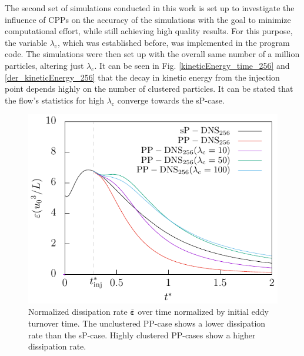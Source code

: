 \documentclass[11pt,a4paper,openany,oneside,parskip=half*]{article}
\renewcommand*\vec[1]{\boldsymbol{#1}}
\begin{document}
\newline
The second set of simulations conducted in this work is set up to investigate the influence of CPPs on the accuracy of the simulations with the goal to minimize computational effort, while still achieving high quality results. For this purpose, the variable $\lambda_\mathrm{c}$, which was established before, was implemented in the program code. The simulations were then set up with the overall same number of a million particles, altering just $\lambda_\mathrm{c}$. It can be seen in Fig. \ref{kineticEnergy_time_256} and \ref{der_kineticEnergy_256} that the decay in kinetic energy from the injection point depends highly on the number of clustered particles. It can be stated that the flow's statistics for high $\lambda_\mathrm{c}$ converge towards the sP-case. 
\begin{figure}[h]
    \centering
    \begin{minipage}[t]{0.5\textwidth}
         \centering
        \includegraphics[width=\linewidth]{./Abbildungen/256/diss_time.pdf}
        \caption{Normalized dissipation rate $\bar{\vec{\varepsilon}}$ over time normalized by initial eddy turnover time. The unclustered PP-case shows a lower dissipation rate than the sP-case. Highly clustered PP-cases show a higher dissipation rate.}
        \label{diss_time_256}
    \end{minipage}%
    \begin{minipage}[t]{0.5\textwidth}
        \centering

\end{minipage}
\end{figure}
\end{document}

